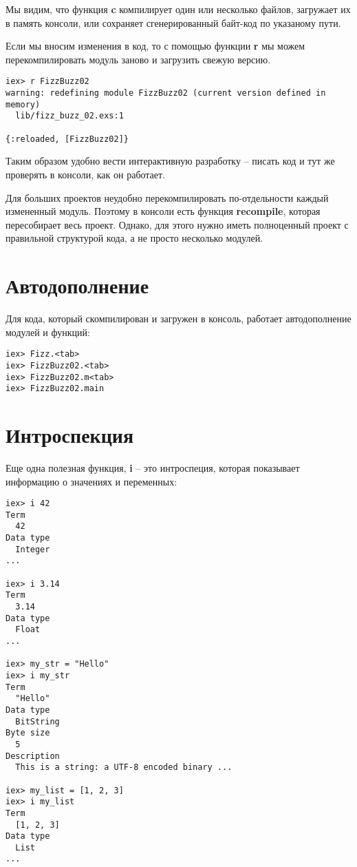 Мы видим, что функция \textbf{c} компилирует один или несколько файлов, загружает их в память консоли, или сохраняет сгенерированный байт-код по указаному пути. 

Если мы вносим изменения в код, то с помощью функции \textbf{r} мы можем перекомпилировать модуль заново и загрузить свежую версию.

\begin{lstlisting}[language=ElixirShell, style=elixir-shell]
iex> r FizzBuzz02
warning: redefining module FizzBuzz02 (current version defined in memory)
  lib/fizz_buzz_02.exs:1

{:reloaded, [FizzBuzz02]}
\end{lstlisting}

Таким образом удобно вести интерактивную разработку -- писать код и тут же проверять в консоли, как он работает. 

Для больших проектов неудобно перекомпилировать по-отдельности каждый измененный модуль. Поэтому в консоли есть функция \textbf{recompile}, которая пересобирает весь проект. Однако, для этого нужно иметь полноценный проект с правильной структурой кода, а не просто несколько модулей.

\section{Автодополнение}

Для кода, который скомпилирован и загружен в консоль, работает автодополнение модулей и функций:

\begin{lstlisting}[language=ElixirShell, style=elixir-shell]
iex> Fizz.<tab>
iex> FizzBuzz02.<tab>
iex> FizzBuzz02.m<tab>
iex> FizzBuzz02.main
\end{lstlisting}

\section{Интроспекция}

Еще одна полезная функция, \textbf{i} -- это интроспеция, которая показывает информацию о значениях и переменных:

\begin{lstlisting}[language=ElixirShell, style=elixir-shell]
iex> i 42
Term
  42
Data type
  Integer
...

iex> i 3.14
Term
  3.14
Data type
  Float
...

iex> my_str = "Hello"
iex> i my_str
Term
  "Hello"
Data type
  BitString
Byte size
  5
Description
  This is a string: a UTF-8 encoded binary ...

iex> my_list = [1, 2, 3]
iex> i my_list
Term
  [1, 2, 3]
Data type
  List
...
\end{lstlisting}

